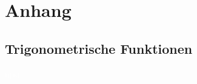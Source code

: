 \newpage
\section{Anhang}

\subsection{Trigonometrische Funktionen}
\textcolor{white}{upsi}\\




\begin{minipage}{\linewidth}

\def\colgray{gray}
\def\colblue{blue}
\def\colred{red}
\def\colblack{black}
\renewcommand{\arraystretch}{1.73}

\centering


\end{minipage}
